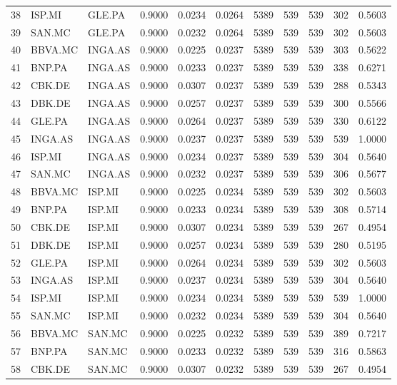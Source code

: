 \begin{table}
\begin{tabular}{lllrrrrrrrr}
38 & ISP.MI & GLE.PA & 0.9000 & 0.0234 & 0.0264 & 5389 & 539 & 539 & 302 & 0.5603 \\
39 & SAN.MC & GLE.PA & 0.9000 & 0.0232 & 0.0264 & 5389 & 539 & 539 & 302 & 0.5603 \\
40 & BBVA.MC & INGA.AS & 0.9000 & 0.0225 & 0.0237 & 5389 & 539 & 539 & 303 & 0.5622 \\
41 & BNP.PA & INGA.AS & 0.9000 & 0.0233 & 0.0237 & 5389 & 539 & 539 & 338 & 0.6271 \\
42 & CBK.DE & INGA.AS & 0.9000 & 0.0307 & 0.0237 & 5389 & 539 & 539 & 288 & 0.5343 \\
43 & DBK.DE & INGA.AS & 0.9000 & 0.0257 & 0.0237 & 5389 & 539 & 539 & 300 & 0.5566 \\
44 & GLE.PA & INGA.AS & 0.9000 & 0.0264 & 0.0237 & 5389 & 539 & 539 & 330 & 0.6122 \\
45 & INGA.AS & INGA.AS & 0.9000 & 0.0237 & 0.0237 & 5389 & 539 & 539 & 539 & 1.0000 \\
46 & ISP.MI & INGA.AS & 0.9000 & 0.0234 & 0.0237 & 5389 & 539 & 539 & 304 & 0.5640 \\
47 & SAN.MC & INGA.AS & 0.9000 & 0.0232 & 0.0237 & 5389 & 539 & 539 & 306 & 0.5677 \\
48 & BBVA.MC & ISP.MI & 0.9000 & 0.0225 & 0.0234 & 5389 & 539 & 539 & 302 & 0.5603 \\
49 & BNP.PA & ISP.MI & 0.9000 & 0.0233 & 0.0234 & 5389 & 539 & 539 & 308 & 0.5714 \\
50 & CBK.DE & ISP.MI & 0.9000 & 0.0307 & 0.0234 & 5389 & 539 & 539 & 267 & 0.4954 \\
51 & DBK.DE & ISP.MI & 0.9000 & 0.0257 & 0.0234 & 5389 & 539 & 539 & 280 & 0.5195 \\
52 & GLE.PA & ISP.MI & 0.9000 & 0.0264 & 0.0234 & 5389 & 539 & 539 & 302 & 0.5603 \\
53 & INGA.AS & ISP.MI & 0.9000 & 0.0237 & 0.0234 & 5389 & 539 & 539 & 304 & 0.5640 \\
54 & ISP.MI & ISP.MI & 0.9000 & 0.0234 & 0.0234 & 5389 & 539 & 539 & 539 & 1.0000 \\
55 & SAN.MC & ISP.MI & 0.9000 & 0.0232 & 0.0234 & 5389 & 539 & 539 & 304 & 0.5640 \\
56 & BBVA.MC & SAN.MC & 0.9000 & 0.0225 & 0.0232 & 5389 & 539 & 539 & 389 & 0.7217 \\
57 & BNP.PA & SAN.MC & 0.9000 & 0.0233 & 0.0232 & 5389 & 539 & 539 & 316 & 0.5863 \\
58 & CBK.DE & SAN.MC & 0.9000 & 0.0307 & 0.0232 & 5389 & 539 & 539 & 267 & 0.4954 \\

\end{tabular}
\end{table}
